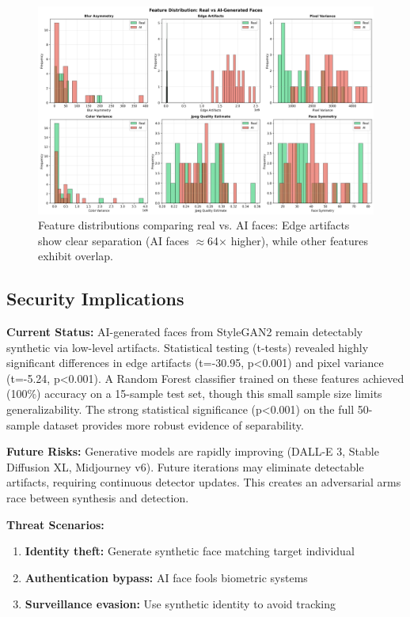 \documentclass[11pt,a4paper]{article}
\begin{document}
\begin{figure}[H]
    \centering
    \includegraphics[width=\textwidth]{runs/ai_detection_distributions.png}
    \caption{Feature distributions comparing real vs. AI faces: Edge artifacts show clear separation (AI faces $\approx$64× higher), while other features exhibit overlap.}
    \label{fig:ai_distributions}
\end{figure}

\subsection{Security Implications}

\textbf{Current Status:} AI-generated faces from StyleGAN2 remain detectably synthetic via low-level artifacts. Statistical testing (t-tests) revealed highly significant differences in edge artifacts (t=-30.95, p<0.001) and pixel variance (t=-5.24, p<0.001). A Random Forest classifier trained on these features achieved (100\%) accuracy on a 15-sample test set, though this small sample size limits generalizability. The strong statistical significance (p<0.001) on the full 50-sample dataset provides more robust evidence of separability.

\textbf{Future Risks:} Generative models are rapidly improving (DALL-E 3, Stable Diffusion XL, Midjourney v6). Future iterations may eliminate detectable artifacts, requiring continuous detector updates. This creates an adversarial arms race between synthesis and detection.

\textbf{Threat Scenarios:}
\begin{enumerate}
    \item \textbf{Identity theft:} Generate synthetic face matching target individual
    \item \textbf{Authentication bypass:} AI face fools biometric systems
    \item \textbf{Surveillance evasion:} Use synthetic identity to avoid tracking
\end{enumerate}
\end{document}
